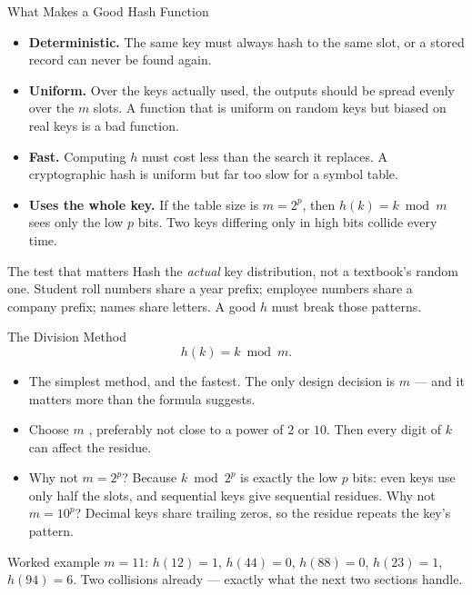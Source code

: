 \documentclass[aspectratio=169]{beamer}
\begin{document}
\begin{frame}{What Makes a Good Hash Function}
  \begin{itemize}
    \item \textbf{Deterministic.} The same key must always hash to the same
      slot, or a stored record can never be found again.
    \item \textbf{Uniform.} Over the keys actually used, the outputs should be
      spread evenly over the $m$ slots. A function that is uniform on random
      keys but biased on real keys is a bad function.
    \item \textbf{Fast.} Computing $h$ must cost less than the search it
      replaces. A cryptographic hash is uniform but far too slow for a symbol
      table.
    \item \textbf{Uses the whole key.} If the table size is $m = 2^p$, then
      $h(k)=k \bmod m$ sees only the low $p$ bits. Two keys differing only in
      high bits collide every time.
  \end{itemize}
  \begin{exampleblock}{The test that matters}
    Hash the \emph{actual} key distribution, not a textbook's random one.
    Student roll numbers share a year prefix; employee numbers share a
    company prefix; names share letters. A good $h$ must break those patterns.
  \end{exampleblock}
\end{frame}

\begin{frame}{The Division Method}
  \[
    h(k) = k \bmod m.
  \]
  \begin{itemize}
    \item The simplest method, and the fastest. The only design decision is
      $m$ --- and it matters more than the formula suggests.
    \item Choose $m$ , preferably not close to a power of $2$ or
      $10$. Then every digit of $k$ can affect the residue.
    \item Why not $m = 2^p$? Because $k \bmod 2^p$ is exactly the low $p$
      bits: even keys use only half the slots, and sequential keys give
      sequential residues. Why not $m = 10^p$? Decimal keys share trailing
      zeros, so the residue repeats the key's pattern.
  \end{itemize}
  \begin{exampleblock}{Worked example}
    $m = 11$: $h(12)=1$, $h(44)=0$, $h(88)=0$, $h(23)=1$, $h(94)=6$.
    Two collisions already --- exactly what the next two sections handle.
  \end{exampleblock}
\end{frame}
\end{document}
